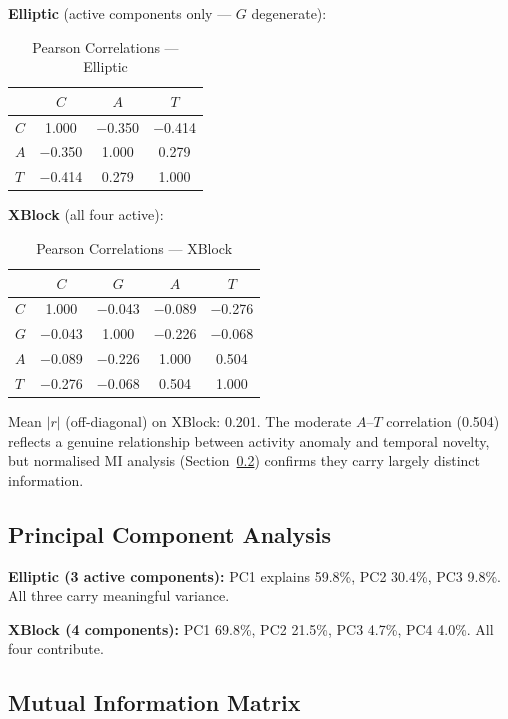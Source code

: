 \documentclass[journal]{IEEEtran}
\begin{document}
\textbf{Elliptic} (active components only --- $G$ degenerate):

\begin{table}[!t]
\centering
\caption{Pearson Correlations --- Elliptic}
\label{tab:corr_elliptic}
\begin{tabular}{@{}lccc@{}}
\toprule
     & $C$    & $A$    & $T$    \\
\midrule
$C$  & 1.000  & $-$0.350 & $-$0.414 \\
$A$  & $-$0.350 & 1.000  & 0.279  \\
$T$  & $-$0.414 & 0.279  & 1.000  \\
\bottomrule
\end{tabular}
\end{table}

\textbf{XBlock} (all four active):

\begin{table}[!t]
\centering
\caption{Pearson Correlations --- XBlock}
\label{tab:corr_xblock}
\begin{tabular}{@{}lcccc@{}}
\toprule
     & $C$    & $G$    & $A$    & $T$    \\
\midrule
$C$  & 1.000  & $-$0.043 & $-$0.089 & $-$0.276 \\
$G$  & $-$0.043 & 1.000  & $-$0.226 & $-$0.068 \\
$A$  & $-$0.089 & $-$0.226 & 1.000  & 0.504  \\
$T$  & $-$0.276 & $-$0.068 & 0.504  & 1.000  \\
\bottomrule
\end{tabular}
\end{table}

Mean $|r|$ (off-diagonal) on XBlock: 0.201. The moderate $A$--$T$ correlation (0.504) reflects a genuine relationship between activity anomaly and temporal novelty, but normalised MI analysis (Section~\ref{ssec:mi_matrix}) confirms they carry largely distinct information.

\subsection{Principal Component Analysis}

\textbf{Elliptic (3 active components):} PC1 explains 59.8\%, PC2 30.4\%, PC3 9.8\%. All three carry meaningful variance.

\textbf{XBlock (4 components):} PC1 69.8\%, PC2 21.5\%, PC3 4.7\%, PC4 4.0\%. All four contribute.

\subsection{Mutual Information Matrix}
\label{ssec:mi_matrix}
\end{document}
